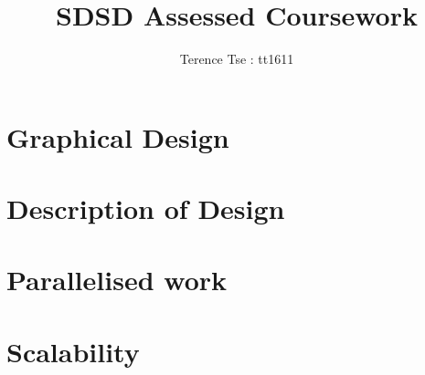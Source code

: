 \documentclass[11pt]{article}
\begin{document}
\title{SDSD Assessed Coursework}
\author{Terence Tse : tt1611}
\maketitle
\newpage

\section{Graphical Design}

\section{Description of Design}


\section{Parallelised work}

\section{Scalability}
\end{document}
